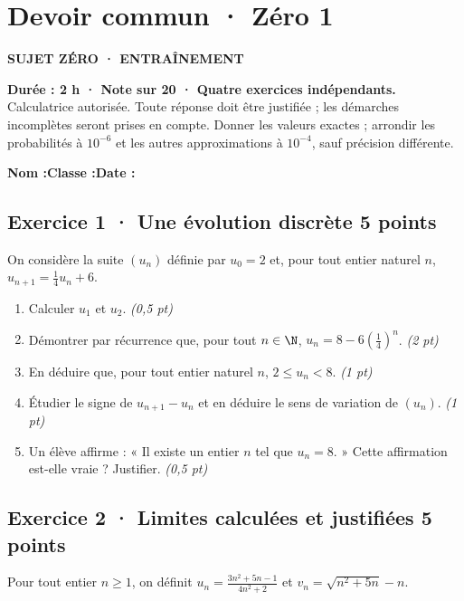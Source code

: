\mxnewpage{}\label{sujet:3-1}

\section*{Devoir commun · Zéro 1}

{\sffamily\bfseries\color{mxmint}SUJET ZÉRO · ENTRAÎNEMENT\par}

\textbf{Durée : 2 h · Note sur 20 · Quatre exercices indépendants.}\\Calculatrice autorisée. Toute réponse doit être justifiée ; les démarches incomplètes seront prises en compte. Donner les valeurs exactes ; arrondir les probabilités à $10^{-6}$ et les autres approximations à $10^{-4}$, sauf précision différente.

\smallskip\textbf{Nom :}\enspace\dotfill\quad\textbf{Classe :}\enspace\dotfill\quad\textbf{Date :}\enspace\dotfill

\subsection*{Exercice 1 · Une évolution discrète \hfill 5 points}On considère la suite $(u_n)$ définie par $u_0=2$ et, pour tout entier naturel $n$, $u_{n+1}=\frac{1}{4}u_n+6$.

\begin{enumerate}

\item Calculer $u_1$ et $u_2$. \hfill\textit{(0{,}5 pt)}

\item Démontrer par récurrence que, pour tout $n\in\N$, $u_n=8-6\left(\frac{1}{4}\right)^n$. \hfill\textit{(2 pt)}

\item En déduire que, pour tout entier naturel $n$, $2\le u_n<8$. \hfill\textit{(1 pt)}

\item Étudier le signe de $u_{n+1}-u_n$ et en déduire le sens de variation de $(u_n)$. \hfill\textit{(1 pt)}

\item Un élève affirme : « Il existe un entier $n$ tel que $u_n=8$. » Cette affirmation est-elle vraie ? Justifier. \hfill\textit{(0{,}5 pt)}

\end{enumerate}

\subsection*{Exercice 2 · Limites calculées et justifiées \hfill 5 points}Pour tout entier $n\ge1$, on définit $u_n=\frac{3n^2+5n-1}{4n^2+2}$ et $v_n=\sqrt{n^2+5n}-n$.

